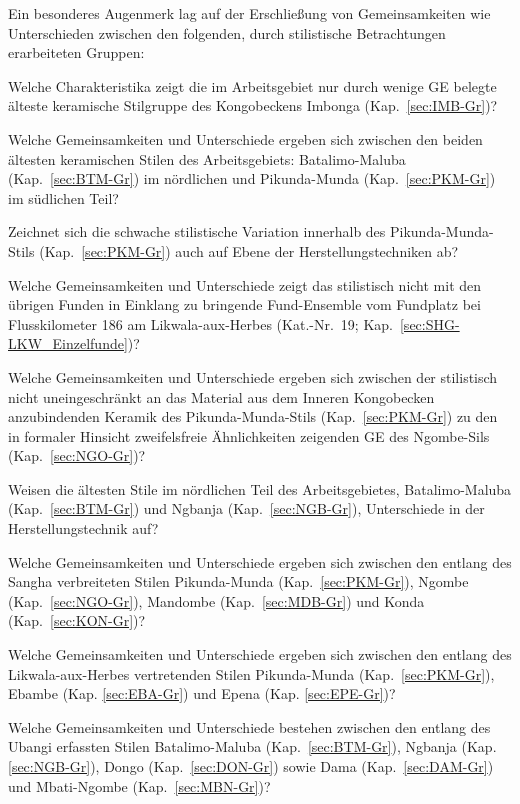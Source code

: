 \begin{multicols}{2}
\noindent Ein besonderes Augenmerk lag auf der Erschließung von Gemeinsamkeiten wie Unterschieden zwischen den folgenden, durch stilistische Betrachtungen erarbeiteten Gruppen:
\begin{itemize*}
	\item Welche Charakteristika zeigt die im Arbeitsgebiet nur durch wenige GE belegte älteste keramische Stilgruppe des Kongobeckens Imbonga (Kap.~\ref{sec:IMB-Gr})?
	\item Welche Gemeinsamkeiten und Unterschiede ergeben sich zwischen den beiden ältesten keramischen Stilen des Arbeitsgebiets: Batalimo-Maluba (Kap.~\ref{sec:BTM-Gr}) im nördlichen und Pikunda-Munda (Kap.~\ref{sec:PKM-Gr}) im südlichen Teil?
	\item Zeichnet sich die schwache stilistische Variation innerhalb des Pikunda-Munda-Stils (Kap.~\ref{sec:PKM-Gr}) auch auf Ebene der Herstellungstechniken ab?
	\item Welche Gemeinsamkeiten und Unterschiede zeigt das stilistisch nicht mit den übrigen Funden in Einklang zu bringende Fund-Ensemble vom Fundplatz bei Flusskilometer 186 am \mbox{Likwala}-\mbox{aux}-\mbox{Herbes} (Kat.-Nr.~19; Kap.~\ref{sec:SHG-LKW_Einzelfunde})?
	\item Welche Gemeinsamkeiten und Unterschiede ergeben sich zwischen der stilistisch nicht uneingeschränkt an das Material aus dem Inneren Kongobecken anzubindenden Keramik des Pikunda-Munda-Stils (Kap.~\ref{sec:PKM-Gr}) zu den in formaler Hinsicht zweifelsfreie Ähnlichkeiten zeigenden GE des Ngombe-Sils (Kap.~\ref{sec:NGO-Gr})?
	\item Weisen die ältesten Stile im nördlichen Teil des Arbeitsgebietes, Batalimo-Maluba (Kap.~\ref{sec:BTM-Gr}) und \mbox{Ngbanja} (Kap.~\ref{sec:NGB-Gr}), Unterschiede in der Herstellungstechnik auf?
	\item Welche Gemeinsamkeiten und Unterschiede ergeben sich zwischen den entlang des \mbox{Sangha} verbreiteten Stilen Pikunda-Munda (Kap.~\ref{sec:PKM-Gr}), Ngombe (Kap.~\ref{sec:NGO-Gr}), Mandombe (Kap.~\ref{sec:MDB-Gr}) und Konda (Kap.~\ref{sec:KON-Gr})?
	\item Welche Gemeinsamkeiten und Unterschiede ergeben sich zwischen den entlang des Likwala-aux-Herbes vertretenden Stilen Pikunda-Munda (Kap.~\ref{sec:PKM-Gr}), Ebambe (Kap. \ref{sec:EBA-Gr}) und Epena (Kap. \ref{sec:EPE-Gr})?
	\item Welche Gemeinsamkeiten und Unterschiede bestehen zwischen den entlang des \mbox{Ubangi} erfassten Stilen Batalimo-Maluba (Kap.~\ref{sec:BTM-Gr}), \mbox{Ngbanja} (Kap.\ref{sec:NGB-Gr}), Dongo (Kap.~\ref{sec:DON-Gr}) sowie Dama (Kap.~\ref{sec:DAM-Gr}) und Mbati-Ngombe (Kap.~\ref{sec:MBN-Gr})?
\end{itemize*}


\end{multicols}
